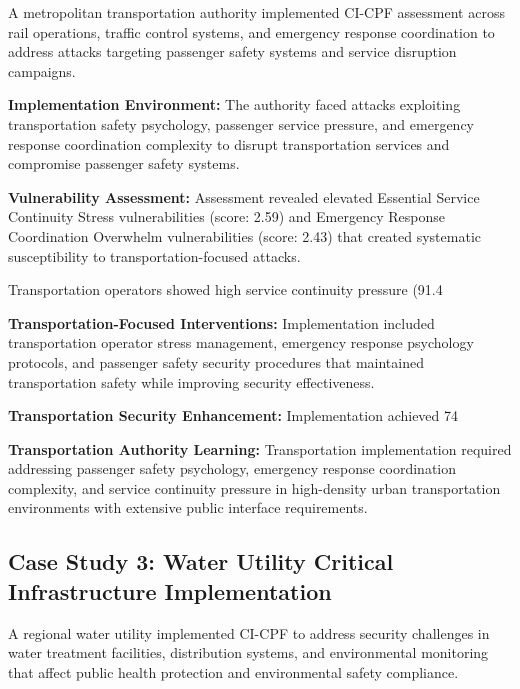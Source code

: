 \documentclass[10pt, twocolumn]{article}
\begin{document}
A metropolitan transportation authority implemented CI-CPF assessment across rail operations, traffic control systems, and emergency response coordination to address attacks targeting passenger safety systems and service disruption campaigns.

\textbf{Implementation Environment:} The authority faced attacks exploiting transportation safety psychology, passenger service pressure, and emergency response coordination complexity to disrupt transportation services and compromise passenger safety systems.

\textbf{Vulnerability Assessment:} Assessment revealed elevated Essential Service Continuity Stress vulnerabilities (score: 2.59) and Emergency Response Coordination Overwhelm vulnerabilities (score: 2.43) that created systematic susceptibility to transportation-focused attacks.

Transportation operators showed high service continuity pressure (91.4%

\textbf{Transportation-Focused Interventions:} Implementation included transportation operator stress management, emergency response psychology protocols, and passenger safety security procedures that maintained transportation safety while improving security effectiveness.

\textbf{Transportation Security Enhancement:} Implementation achieved 74%

\textbf{Transportation Authority Learning:} Transportation implementation required addressing passenger safety psychology, emergency response coordination complexity, and service continuity pressure in high-density urban transportation environments with extensive public interface requirements.

\subsection{Case Study 3: Water Utility Critical Infrastructure Implementation}

A regional water utility implemented CI-CPF to address security challenges in water treatment facilities, distribution systems, and environmental monitoring that affect public health protection and environmental safety compliance.
\end{document}
